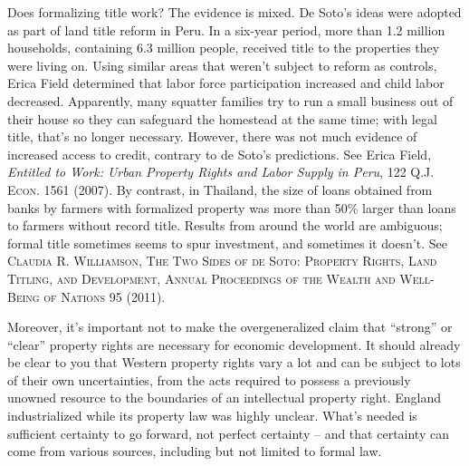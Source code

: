 Does formalizing title work? The evidence is mixed. De Soto's ideas were adopted
as part of land title reform in Peru. In a six-year period, more than 1.2
million households, containing 6.3 million people, received title to the
properties they were living on. Using similar areas that weren't subject to
reform as controls, Erica Field determined that labor force participation
increased and child labor decreased. Apparently, many squatter families try to
run a small business out of their house so they can safeguard the homestead at
the same time; with legal title, that's no longer necessary. However, there was
not much evidence of increased access to credit, contrary to de Soto's
predictions. See Erica Field, \textit{Entitled to Work: Urban Property Rights
and Labor Supply in Peru}, 122 \textsc{Q.J. Econ.} 1561 (2007). By contrast, in
Thailand, the size of loans obtained from banks by farmers with formalized
property was more than 50\% larger than loans to farmers without record title.
Results from around the world are ambiguous; formal title sometimes seems to
spur investment, and sometimes it doesn't. See \textsc{Claudia R. Williamson,
The Two Sides of de Soto: Property Rights, Land Titling, and Development,
Annual Proceedings of the Wealth and Well-Being of Nations }95 (2011).

Moreover, it's important not to make the overgeneralized claim that ``strong''
or ``clear'' property rights are necessary for economic development. It should
already be clear to you that Western property rights vary a lot and can be
subject to lots of their own uncertainties, from the acts required to possess a
previously unowned resource to the boundaries of an intellectual property
right. England industrialized while its property law was highly unclear. What's
needed is sufficient certainty to go forward, not perfect certainty -- and that
certainty can come from various sources, including but not limited to formal
law.

